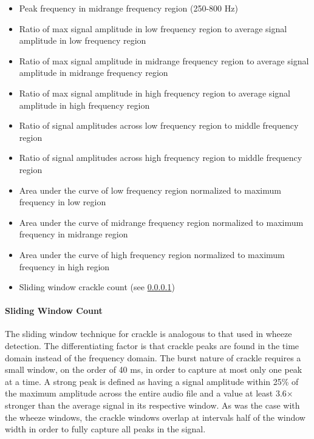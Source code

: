 \documentclass{article}
\begin{document}
\begin{itemize}[noitemsep,nolistsep]
\item
	Peak frequency in midrange frequency region (250-800 Hz)\\
\item
	Ratio of max signal amplitude in low frequency region to average signal amplitude in low frequency region\\
\item
	Ratio of max signal amplitude in midrange frequency region to average signal amplitude in midrange frequency region\\
\item
	Ratio of max signal amplitude in high frequency region to average signal amplitude in high frequency region\\
\item
	Ratio of signal amplitudes across low frequency region to middle frequency region\\
\item
	Ratio of signal amplitudes across high frequency region to middle frequency region\\
\item
	Area under the curve of low frequency region normalized to maximum frequency in low region\\
\item
	Area under the curve of midrange frequency region normalized to maximum frequency in midrange region\\
\item
	Area under the curve of high frequency region normalized to maximum frequency in high region\\
\item
	Sliding window crackle count (see \ref{Crackle Sliding Window})\\
\end{itemize}

\paragraph{Sliding Window Count}\label{Crackle Sliding Window}

The sliding window technique for crackle is analogous to that used in wheeze detection. The differentiating factor is that crackle peaks are found in the time domain instead of the frequency domain. The burst nature of crackle requires a small window, on the order of 40 ms, in order to capture at most only one peak at a time. A strong peak is defined as having a signal amplitude within 25\% of the maximum amplitude across the entire audio file and a value at least 3.6$\times$ stronger than the average signal in its respective window. As was the case with the wheeze windows, the crackle windows overlap at intervals half of the window width in order to fully capture all peaks in the signal.
\newpage
\end{document}
